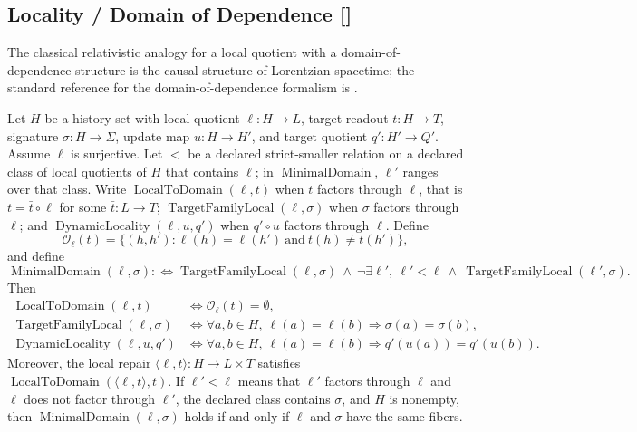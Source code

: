 \subsection{Locality / Domain of Dependence [\texorpdfstring{}{F45}]}\label{sec:self-reference-limits:locality}

The classical relativistic analogy for a local quotient with a
domain-of-dependence structure is the causal structure of
Lorentzian spacetime; the standard reference for the
domain-of-dependence formalism is \citet[Chapter~8]{Wald1984GR}.

\begin{theorem}\label{thm:F45}
Let \(H\) be a history set with local quotient \(\ell:H\to L\),
target readout \(t:H\to T\), signature \(\sigma:H\to\Sigma\), update
map \(u:H\to H'\), and target quotient \(q':H'\to Q'\). Assume
\(\ell\) is surjective. Let \(<\) be a declared strict-smaller relation on a
declared class of local quotients of \(H\) that contains \(\ell\); in
\(\operatorname{MinimalDomain}\), \(\ell'\) ranges over that class. Write
\(\operatorname{LocalToDomain}(\ell,t)\) when \(t\) factors through \(\ell\),
that is \(t=\bar t\circ\ell\) for some \(\bar t:L\to T\);
\(\operatorname{TargetFamilyLocal}(\ell,\sigma)\) when \(\sigma\) factors
through \(\ell\); and \(\operatorname{DynamicLocality}(\ell,u,q')\) when
\(q'\circ u\) factors through \(\ell\). Define
\[
  \mathcal O_\ell(t)=
  \{(h,h'):\ell(h)=\ell(h')\ \text{and}\ t(h)\ne t(h')\},
\]
and define
\[
  \operatorname{MinimalDomain}(\ell,\sigma)
  :\Longleftrightarrow \operatorname{TargetFamilyLocal}(\ell,\sigma)\ \wedge\
  \neg\exists \ell',\ \ell'\!<\ell\ \wedge\
  \operatorname{TargetFamilyLocal}(\ell',\sigma).
\]
Then
\begin{align*}
  \operatorname{LocalToDomain}(\ell,t)
  &\iff \mathcal O_\ell(t)=\emptyset,\\
  \operatorname{TargetFamilyLocal}(\ell,\sigma)
  &\iff
  \forall a,b\in H,\ \ell(a)=\ell(b)\Rightarrow \sigma(a)=\sigma(b),\\
  \operatorname{DynamicLocality}(\ell,u,q')
  &\iff
  \forall a,b\in H,\ \ell(a)=\ell(b)\Rightarrow q'(u(a))=q'(u(b)).
\end{align*}
Moreover, the local repair \(\langle\ell,t\rangle:H\to L\times T\) satisfies
\(\operatorname{LocalToDomain}(\langle\ell,t\rangle,t)\). If \(\ell'<\ell\)
means that \(\ell'\) factors through \(\ell\) and \(\ell\) does not factor
through \(\ell'\), the declared class contains \(\sigma\), and \(H\) is
nonempty, then \(\operatorname{MinimalDomain}(\ell,\sigma)\) holds if and only if \(\ell\) and
\(\sigma\) have the same fibers.
\end{theorem}
